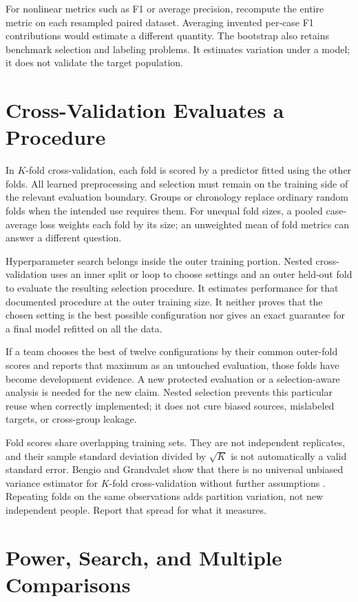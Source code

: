 For nonlinear metrics such as F1 or average precision, recompute the entire metric on each resampled paired dataset. Averaging invented per-case F1 contributions would estimate a different quantity. The bootstrap also retains benchmark selection and labeling problems. It estimates variation under a model; it does not validate the target population.

\section{Cross-Validation Evaluates a Procedure}

In $K$-fold cross-validation, each fold is scored by a predictor fitted using the other folds. All learned preprocessing and selection must remain on the training side of the relevant evaluation boundary. Groups or chronology replace ordinary random folds when the intended use requires them. For unequal fold sizes, a pooled case-average loss weights each fold by its size; an unweighted mean of fold metrics can answer a different question.

Hyperparameter search belongs inside the outer training portion. Nested cross-validation uses an inner split or loop to choose settings and an outer held-out fold to evaluate the resulting selection procedure. It estimates performance for that documented procedure at the outer training size. It neither proves that the chosen setting is the best possible configuration nor gives an exact guarantee for a final model refitted on all the data.

If a team chooses the best of twelve configurations by their common outer-fold scores and reports that maximum as an untouched evaluation, those folds have become development evidence. A new protected evaluation or a selection-aware analysis is needed for the new claim. Nested selection prevents this particular reuse when correctly implemented; it does not cure biased sources, mislabeled targets, or cross-group leakage.

Fold scores share overlapping training sets. They are not independent replicates, and their sample standard deviation divided by $\sqrt K$ is not automatically a valid standard error. Bengio and Grandvalet show that there is no universal unbiased variance estimator for $K$-fold cross-validation without further assumptions \citep{bengio2004cv}. Repeating folds on the same observations adds partition variation, not new independent people. Report that spread for what it measures.

\section{Power, Search, and Multiple Comparisons}


